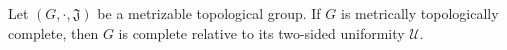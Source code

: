 Let $(G, \cdot, \mathfrak{J})$ be a metrizable topological group. If $G$ is metrically topologically complete, then $G$ is complete relative to its two-sided uniformity $\mathcal{U}$.
